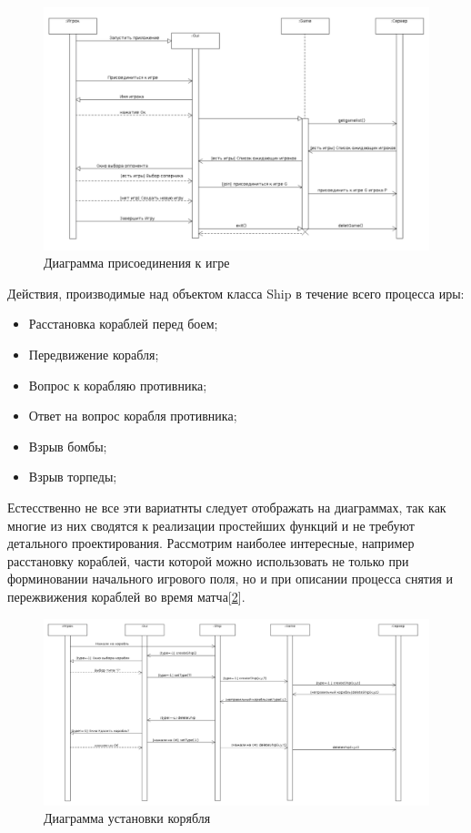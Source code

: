 \begin{figure}[pt]
\centering
\includegraphics[width=18cm]{images/JG.png}
\caption{Диаграмма присоединения к игре}
\label{fig10}
\end{figure}

Действия, производимые над объектом класса Ship в течение всего процесса иры:
	\begin{itemize}
		\item Расстановка кораблей перед боем;
		\item Передвижение корабля;
		\item Вопрос к корабляю противника;
		\item Ответ на вопрос корабля противника;
		\item Взрыв бомбы;
		\item Взрыв торпеды;
  	\end{itemize} 
Естесственно не все эти вариатнты следует отображать на диаграммах, так как многие из них сводятся к реализации простейших функций и не требуют детального проектирования. Рассмотрим наиболее интересные, например расстановку кораблей, части которой можно использовать не только при форминовании начального игрового поля, но и при описании процесса снятия и пережвижения кораблей во время матча[\ref{fig11}].

\begin{figure}[pt]
\centering
\includegraphics[width=18cm]{images/CRS.png}
\caption{Диаграмма установки корябля}
\label{fig11}
\end{figure}

